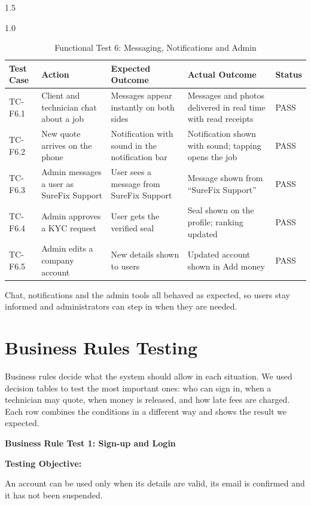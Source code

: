 \documentclass[A4paper,12pt]{report}
\theoremstyle{plain}
\theoremstyle{definition}
\theoremstyle{remark}
\numberwithin{equation}{section}
\begin{document}
\begin{spacing}{1.5}
\begin{table}[H]
\centering
\caption{Functional Test 6: Messaging, Notifications and Admin}
\begin{spacing}{1.0}
{\small
\begin{tabular}{|p{}|p{}|p{}|p{}|p{}|}
\hline
\textbf{Test Case} & \textbf{Action} & \textbf{Expected Outcome} & \textbf{Actual Outcome} & \textbf{Status} \\ \hline
TC-F6.1 & Client and technician chat about a job & Messages appear instantly on both sides & Messages and photos delivered in real time with read receipts & PASS \\ \hline
TC-F6.2 & New quote arrives on the phone & Notification with sound in the notification bar & Notification shown with sound; tapping opens the job & PASS \\ \hline
TC-F6.3 & Admin messages a user as SureFix Support & User sees a message from SureFix Support & Message shown from ``SureFix Support'' & PASS \\ \hline
TC-F6.4 & Admin approves a KYC request & User gets the verified seal & Seal shown on the profile; ranking updated & PASS \\ \hline
TC-F6.5 & Admin edits a company account & New details shown to users & Updated account shown in Add money & PASS \\ \hline
\end{tabular}}
\end{spacing}
\end{table}

Chat, notifications and the admin tools all behaved as expected, so users stay informed and administrators can step in when they are needed.

\section{Business Rules Testing}

Business rules decide what the system should allow in each situation. We used decision tables to test the most important ones: who can sign in, when a technician may quote, when money is released, and how late fees are charged. Each row combines the conditions in a different way and shows the result we expected.

\textbf{Business Rule Test 1: Sign-up and Login}

\textbf{Testing Objective:}

An account can be used only when its details are valid, its email is confirmed and it has not been suspended.


\end{spacing}
\end{document}
